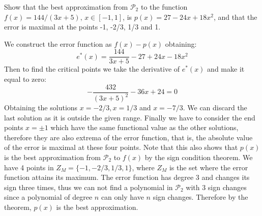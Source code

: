 \begin{problem}
Show that the best approximation from $\mathcal{P}_2$ to the function $f(x) = 144/(3x + 5), \, x \in [-1, 1]$, is $p(x) = 27 - 24x + 18x^2$, and that the error is maximal at the points -1, -2/3, 1/3 and 1.
\end{problem}

\begin{solution}
We construct the error function as $f(x) - p(x)$ obtaining:
\begin{equation*}
e^*(x) = \frac{144}{3x+5} - 27 + 24x-18x^2
\end{equation*}
Then to find the critical points we take the derivative of $e^*(x)$ and make it equal to zero:
\begin{equation*}
-\frac{432}{(3x+5)^2} - 36x + 24 = 0
\end{equation*}
Obtaining the solutions $x = -2/3, x =  1/3$ and $x = -7/3$. We can discard the last solution as it is outside the given range. Finally we have to consider the end points $x = \pm 1$ which have the same functional value as the other solutions, therefore they are also extrema of the error function, that is, the absolute value of the error is maximal at these four points. Note that this also shows that $p(x)$ is the best approximation from $\mathcal{P}_2$ to $f(x)$ by the sign condition theorem. We have 4 points in $Z_M = \{-1,-2/3,1/3,1\}$, where $Z_M$ is the set where the error function attains its maximum. The error function has degree 3 and changes its sign three times, thus we can not find a polynomial in $\mathcal{P}_2$ with 3 sign changes since a polynomial of degree $n$ can only have $n$ sign changes. Therefore by the theorem, $p(x)$ is the best approximation.
\end{solution}